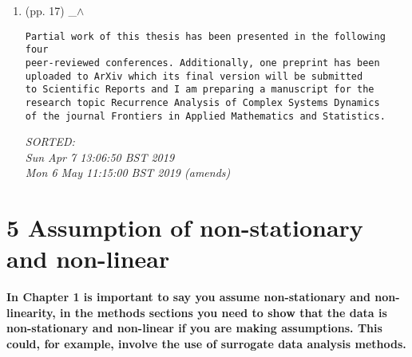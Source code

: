 \documentclass[12pt]{article}
\begin{document}
%

\begin{enumerate}

\item  (pp. 17)  \_$\wedge$  

	\begin{verbatim}	
Partial work of this thesis has been presented in the following four 
peer-reviewed conferences. Additionally, one preprint has been 
uploaded to ArXiv which its final version will be submitted 
to Scientific Reports and I am preparing a manuscript for the 
research topic Recurrence Analysis of Complex Systems Dynamics
of the journal Frontiers in Applied Mathematics and Statistics.
\end{verbatim}
	\textit{
	SORTED:  \\
	Sun Apr  7 13:06:50 BST 2019 \\
	Mon  6 May 11:15:00 BST 2019 (amends)
	}
	\\


\end{enumerate}


\section*{5  Assumption of non-stationary and non-linear}
\textbf{
In Chapter 1 is important to say you assume non-stationary and non-linearity,
in the methods sections you need to show that the data is non-stationary 
and non-linear if you are making assumptions. 
This could, for example, involve the use of surrogate data analysis
methods.
}
\end{document}
